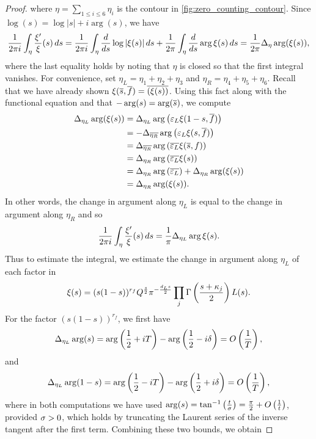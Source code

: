 \documentclass[12pt]{article}
\begin{document}
\begin{proof}
      where \(\eta = \sum_{1 \le i \le 6}\eta_{i}\) is the contour in \cref{fig:zero_counting_contour}. Since \(\log(s) = \log{|s|}+i\arg(s)\), we have
      \[
        \frac{1}{2\pi i}\int_{\eta}\frac{\xi'}{\xi}(s)\,ds = \frac{1}{2\pi i}\int_{\eta}\frac{d}{ds}\log{|\xi(s)|}\,ds+\frac{1}{2\pi }\int_{\eta}\frac{d}{ds}\arg\xi(s)\,ds = \frac{1}{2\pi}\Delta_{\eta}\arg(\xi(s)),
      \]
      where the last equality holds by noting that \(\eta\) is closed so that the first integral vanishes. For convenience, set \(\eta_{L} = \eta_{1}+\eta_{2}+\eta_{3}\) and \(\eta_{R} = \eta_{4}+\eta_{5}+\eta_{6}\). Recall that we have already shown \(\xi(\overline{s},\overline{f}) = \overline{(\xi(s))}\). Using this fact along with the functional equation and that \(-\arg(s) = \arg(\overline{s})\), we compute
      \begin{align*}
        \Delta_{\eta_{L}}\arg(\xi(s)) &= \Delta_{\eta_{L}}\arg\left(\varepsilon_{L}\xi(1-s,\overline{f})\right) \\
        &= -\Delta_{\overline{\eta_{R}}}\arg\left(\varepsilon_{L}\xi(s,\overline{f})\right) \\
        &= \Delta_{\overline{\eta_{R}}}\arg\left(\overline{\varepsilon_{L}}\xi(\overline{s},f)\right) \\
        &= \Delta_{\eta_{R}}\arg\left(\overline{\varepsilon_{L}}\xi(s)\right) \\
        &= \Delta_{\eta_{R}}\arg\left(\overline{\varepsilon_{L}}\right)+\Delta_{\eta_{R}}\arg(\xi(s)) \\
        &= \Delta_{\eta_{R}}\arg(\xi(s)).
      \end{align*}
      In other words, the change in argument along \(\eta_{L}\) is equal to the change in argument along \(\eta_{R}\) and so
      \[
        \frac{1}{2\pi i}\int_{\eta}\frac{\xi'}{\xi}(s)\,ds = \frac{1}{\pi}\Delta_{\eta_{L}}\arg\xi(s).
      \]
      Thus to estimate the integral, we estimate the change in argument along \(\eta_{L}\) of each factor in
      \[
        \xi(s) = (s(1-s))^{r_{f}}Q^{\frac{s}{2}}\pi^{-\frac{d_{L}s}{2}}\prod_{j}\Gamma\left(\frac{s+\kappa_{j}}{2}\right)L(s).
      \]
      For the factor \((s(1-s))^{r_{f}}\), we first have
      \[
        \Delta_{\eta_{L}}\arg(s) = \arg\left(\frac{1}{2}+iT\right)-\arg\left(\frac{1}{2}-i\delta\right) = O\left(\frac{1}{T}\right),
      \]
      and
      \[
        \Delta_{\eta_{L}}\arg(1-s) = \arg\left(\frac{1}{2}-iT\right)-\arg\left(\frac{1}{2}+i\delta\right) = O\left(\frac{1}{T}\right),
      \]
      where in both computations we have used \(\arg(s) = \tan^{-1}\left(\frac{t}{\sigma}\right) = \frac{\pi}{2}+O\left(\frac{1}{t}\right)\), provided \(\sigma > 0\), which holds by truncating the Laurent series of the inverse tangent after the first term. Combining these two bounds, we obtain

\end{proof}
\end{document}
